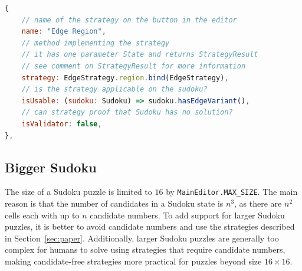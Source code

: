 \noindent
\begin{minipage}{\textwidth}
\begin{lstlisting}[language=JavaScript]
{
    // name of the strategy on the button in the editor
    name: "Edge Region",
    // method implementing the strategy
    // it has one parameter State and returns StrategyResult
    // see comment on StrategyResult for more information
    strategy: EdgeStrategy.region.bind(EdgeStrategy),
    // is the strategy applicable on the sudoku?
    isUsable: (sudoku: Sudoku) => sudoku.hasEdgeVariant(),
    // can strategy proof that Sudoku has no solution?
    isValidator: false,
},
\end{lstlisting}
\end{minipage}

\subsection*{Bigger Sudoku}

The size of a Sudoku puzzle is limited to $16$ by \texttt{MainEditor.MAX\_SIZE}.
The main reason is that the number of candidates in a Sudoku state is $n^3$,
as there are $n^2$ cells each with up to $n$ candidate numbers.
To add support for larger Sudoku puzzles,
it is better to avoid candidate numbers and use the strategies described in Section~\ref{sec:paper}.
Additionally, larger Sudoku puzzles are generally too complex for humans to solve
using strategies that require candidate numbers,
making candidate-free strategies more practical for puzzles beyond size $16 \times 16$.
